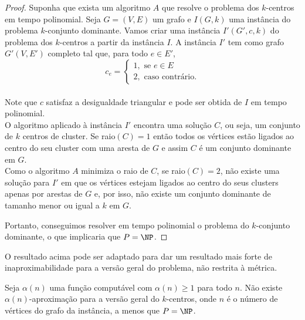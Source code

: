 \begin{proof}
    Suponha que exista um algoritmo $A$ que resolve o problema dos $k$-centros em tempo polinomial. Seja $G = (V,E)$ um grafo e $I(G,k)$ uma instância do problema $k$-conjunto dominante. Vamos criar uma instância $I'(G',c,k)$ do problema dos $k$-centros a partir da instância $I$. A instância $I'$ tem como grafo $G'(V,E')$ completo tal que, para todo $e \in E'$, \\
    \[
    c_e = \begin{cases}
            1, \text{ se } e \in E \\
            2, \text{ caso contrário.} 
            \end{cases}\]\\
    Note que $c$ satisfaz a desigualdade triangular e pode ser obtida de $I$ em tempo polinomial.\\
    O algoritmo aplicado à instância $I'$ encontra uma solução $C$, ou seja, um conjunto de $k$ centros de cluster. Se raio$(C)=1$ então todos os vértices estão ligados ao centro do seu cluster com uma aresta de $G$ e assim $C$ é um conjunto dominante em $G$. \\
    Como o algoritmo $A$ minimiza o raio de $C$, se raio$(C)=2$, não existe uma solução para $I'$ em que os vértices estejam ligados ao centro do seus clusters apenas por arestas de $G$ e, por isso, não existe um conjunto dominante de tamanho menor ou igual a $k$ em $G$.

    Portanto, conseguimos resolver em tempo polinomial o problema do $k$-conjunto dominante, o que implicaria que $P = \NP$.
\end{proof}

O resultado acima pode ser adaptado para dar um resultado mais forte de inaproximabilidade para a versão geral do problema, não restrita à métrica.
\begin{theorem}
    Seja $\alpha(n)$ uma função computável com $\alpha(n)\geq 1$ para todo $n$. Não existe $\alpha(n)$-aproximação para a versão geral do $k$-centros, onde $n$ é o número de vértices do grafo da instância, a menos que $P=\NP$.
\end{theorem}

